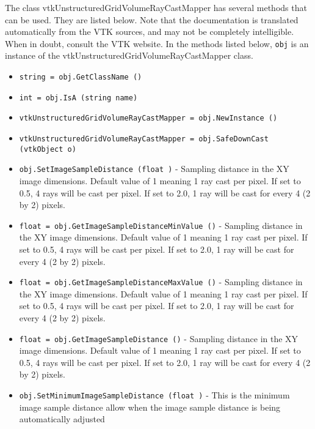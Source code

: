 The class vtkUnstructuredGridVolumeRayCastMapper has several methods that can be used.
  They are listed below.
Note that the documentation is translated automatically from the VTK sources,
and may not be completely intelligible.  When in doubt, consult the VTK website.
In the methods listed below, \verb|obj| is an instance of the vtkUnstructuredGridVolumeRayCastMapper class.
\begin{itemize}
\item  \verb|string = obj.GetClassName ()|

\item  \verb|int = obj.IsA (string name)|

\item  \verb|vtkUnstructuredGridVolumeRayCastMapper = obj.NewInstance ()|

\item  \verb|vtkUnstructuredGridVolumeRayCastMapper = obj.SafeDownCast (vtkObject o)|

\item  \verb|obj.SetImageSampleDistance (float )| -  Sampling distance in the XY image dimensions. Default value of 1 meaning
 1 ray cast per pixel. If set to 0.5, 4 rays will be cast per pixel. If
 set to 2.0, 1 ray will be cast for every 4 (2 by 2) pixels.

\item  \verb|float = obj.GetImageSampleDistanceMinValue ()| -  Sampling distance in the XY image dimensions. Default value of 1 meaning
 1 ray cast per pixel. If set to 0.5, 4 rays will be cast per pixel. If
 set to 2.0, 1 ray will be cast for every 4 (2 by 2) pixels.

\item  \verb|float = obj.GetImageSampleDistanceMaxValue ()| -  Sampling distance in the XY image dimensions. Default value of 1 meaning
 1 ray cast per pixel. If set to 0.5, 4 rays will be cast per pixel. If
 set to 2.0, 1 ray will be cast for every 4 (2 by 2) pixels.

\item  \verb|float = obj.GetImageSampleDistance ()| -  Sampling distance in the XY image dimensions. Default value of 1 meaning
 1 ray cast per pixel. If set to 0.5, 4 rays will be cast per pixel. If
 set to 2.0, 1 ray will be cast for every 4 (2 by 2) pixels.

\item  \verb|obj.SetMinimumImageSampleDistance (float )| -  This is the minimum image sample distance allow when the image
 sample distance is being automatically adjusted


\end{itemize}
